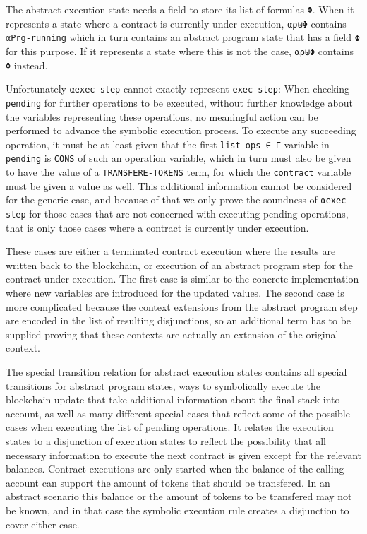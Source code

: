 The abstract execution state needs a field to store its list of formulas \verb/Φ/.
When it represents a state where a contract is currently under execution,
\verb/αρ⊎Φ/ contains \verb/αPrg-running/ which in turn contains an abstract program state
that has a field \verb/Φ/ for this purpose.
If it represents a state where this is not the case, \verb/αρ⊎Φ/ contains \verb/Φ/ instead.

Unfortunately \verb/αexec-step/ cannot exactly represent \verb/exec-step/:
When checking \verb/pending/ for further operations to be executed,
without further knowledge about the variables representing these operations,
no meaningful action can be performed to advance the symbolic execution process.
To execute any succeeding operation, it must be at least given that the first
\verb/list ops ∈ Γ/ variable in \verb/pending/ is \verb/CONS/ of such an operation variable,
which in turn must also be given to have the value of a \verb/TRANSFERE-TOKENS/ term,
for which the \verb/contract/ variable must be given a value as well.
This additional information cannot be considered for the generic case,
and because of that we only prove the soundness of \verb/αexec-step/ for those cases that
are not concerned with executing pending operations, that is only those cases where a
contract is currently under execution.

These cases are either a terminated contract execution where the results are written back
to the blockchain, or execution of an abstract program step for the contract under execution.
The first case is similar to the concrete implementation where new variables are introduced
for the updated values.
The second case is more complicated because the context extensions from the abstract program step
are encoded in the list of resulting disjunctions,
so an additional term has to be supplied proving that these contexts are actually an extension
of the original context.

The special transition relation for abstract execution states
contains all special transitions for abstract program states,
ways to symbolically execute the blockchain update that take additional information about
the final stack into account,
as well as many different special cases that reflect some of the possible cases
when executing the list of pending operations.
It relates the execution states to a disjunction of execution states to reflect the possibility
that all necessary information to execute the next contract is given except for the
relevant balances.
Contract executions are only started when the balance of the calling account can support
the amount of tokens that should be transfered.
In an abstract scenario this balance or the amount of tokens to be transfered may not be known,
and in that case the symbolic execution rule creates a disjunction to cover either case.

